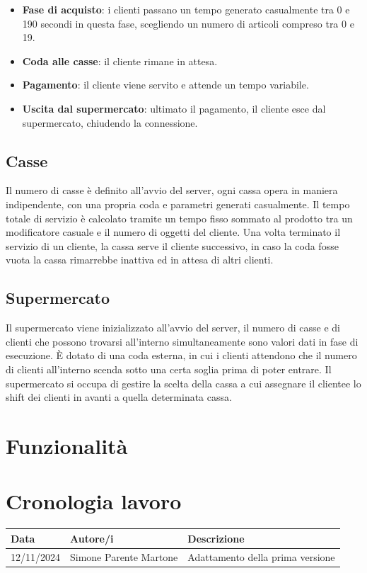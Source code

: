 \documentclass[a4paper, 12pt]{article}
\begin{document}
\begin{itemize}[noitemsep,topsep=0pt,parsep=0pt,partopsep=0pt]
    \item \textbf{Fase di acquisto}: i clienti passano un tempo generato casualmente
    tra 0 e 190 secondi in questa fase, scegliendo un numero di articoli compreso
    tra 0 e 19.
    \item \textbf{Coda alle casse}: il cliente rimane in attesa.
    \item \textbf{Pagamento}: il cliente viene servito e attende un tempo
    variabile.
    \item \textbf{Uscita dal supermercato}: ultimato il pagamento, il cliente esce dal
    supermercato, chiudendo la connessione.

\end{itemize}


\subsection{Casse}
Il numero di casse è definito all'avvio del server, ogni cassa opera in 
maniera indipendente, con una propria coda e parametri generati casualmente.
Il tempo totale di servizio è calcolato tramite un tempo fisso sommato al prodotto tra
un modificatore casuale e il numero di oggetti del cliente.
Una volta terminato il servizio di un cliente, la cassa serve il cliente successivo,
in caso la coda fosse vuota la cassa rimarrebbe inattiva ed in attesa di altri clienti.

\newpage

\subsection{Supermercato}
Il supermercato viene inizializzato all'avvio del server, il numero di casse e di clienti
che possono trovarsi all'interno simultaneamente sono valori dati in fase di esecuzione.
È dotato di una coda esterna, in cui i clienti attendono che il numero di clienti all'interno
scenda sotto una certa soglia prima di poter entrare.
Il supermercato si occupa di gestire la scelta della cassa a cui assegnare il clientee  lo shift
dei clienti in avanti a quella determinata cassa.
\section{Funzionalità}

\section{Cronologia lavoro}

\begin{center}
    \begin{tabular}{lll}
        \hline
        \textbf{Data} & \textbf{Autore/i} & \textbf{Descrizione} \\
        \hline
        12/11/2024 & Simone Parente Martone & Adattamento della prima versione \\
        \hline
    \end{tabular}
    \end{center}
\end{document}
